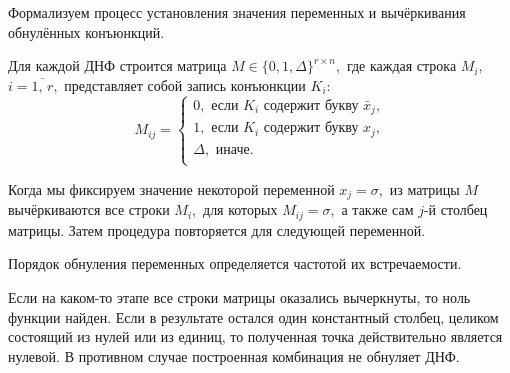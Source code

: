 \documentclass[12pt,a4paper,oneside,fleqn,leqno]{article}
\theoremstyle{definition}
\begin{document}
		Формализуем процесс установления значения переменных и вычёркивания обнулённых конъюнкций.\par
		Для каждой ДНФ строится матрица $M \in \{0, 1, \Delta\}^{r \times n},$ где каждая строка $M_i,$\\$i=\overline{1,\,r},$ представляет собой запись конъюнкции $K_i$:
			$$
				M_{ij} = \begin{cases}
					0,\text{ если $K_i$ содержит букву $\bar{x}_j$,}\\
					1,\text{ если $K_i$ содержит букву $x_j$,}\\
					\Delta,\text{ иначе.}\\
				\end{cases}
			$$\par
			Когда мы фиксируем значение некоторой переменной $x_j = \sigma,$ из матрицы $M$ вычёркиваются все строки $M_i,$ для которых $M_{ij} = \sigma,$ а также сам $j$-й столбец матрицы. Затем процедура повторяется для следующей переменной.\par
			Порядок обнуления переменных определяется частотой их встречаемости.\par
			Если на каком-то этапе все строки матрицы оказались вычеркнуты, то ноль функции найден. Если в результате остался один константный столбец, целиком состоящий из нулей или из единиц, то полученная точка действительно является нулевой. В противном случае построенная комбинация не обнуляет ДНФ.\par
\end{document}
